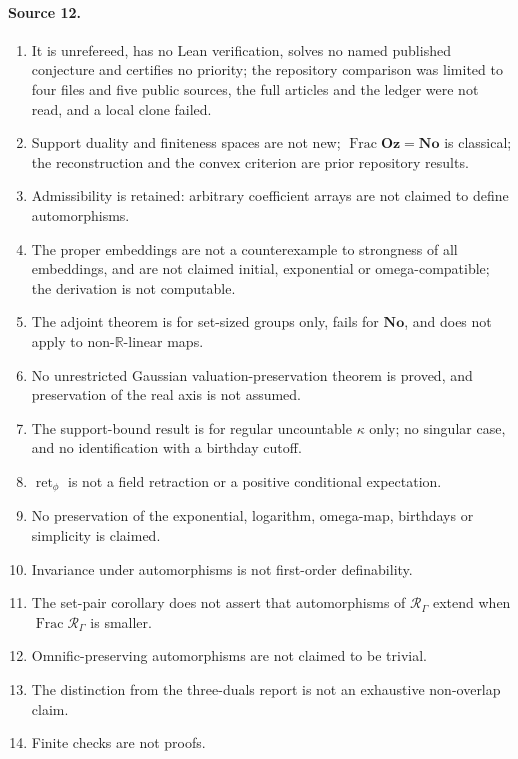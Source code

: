 \documentclass[11pt,oneside]{article}
\numberwithin{equation}{section}
\theoremstyle{definition}
\theoremstyle{remark}
\newcommand{\No}{\mathbf{No}}
\newcommand{\Oz}{\mathbf{Oz}}
\newcommand{\R}{\mathbb R}
\newcommand{\Frac}{\operatorname{Frac}}
\newcommand{\ret}{\operatorname{ret}}
\begin{document}
\paragraph{Source 12.}
\begin{enumerate}[itemsep=1pt]
\item It is unrefereed, has no Lean verification, solves no named published conjecture and
certifies no priority; the repository comparison was limited to four files and five public
sources, the full articles and the ledger were not read, and a local clone failed.
\item Support duality and finiteness spaces are not new; $\Frac\Oz=\No$ is classical; the
reconstruction and the convex criterion are prior repository results.
\item Admissibility is retained: arbitrary coefficient arrays are not claimed to define
automorphisms.
\item The proper embeddings are not a counterexample to strongness of all embeddings, and are not
claimed initial, exponential or omega-compatible; the derivation is not computable.
\item The adjoint theorem is for set-sized groups only, fails for $\No$, and does not apply to
non-$\R$-linear maps.
\item No unrestricted Gaussian valuation-preservation theorem is proved, and preservation of the
real axis is not assumed.
\item The support-bound result is for regular uncountable $\kappa$ only; no singular case, and no
identification with a birthday cutoff.
\item $\ret_\phi$ is not a field retraction or a positive conditional expectation.
\item No preservation of the exponential, logarithm, omega-map, birthdays or simplicity is
claimed.
\item Invariance under automorphisms is not first-order definability.
\item The set-pair corollary does not assert that automorphisms of $\mathcal R_\Gamma$ extend
when $\Frac\mathcal R_\Gamma$ is smaller.
\item Omnific-preserving automorphisms are not claimed to be trivial.
\item The distinction from the three-duals report is not an exhaustive non-overlap claim.
\item Finite checks are not proofs.
\end{enumerate}
\end{document}
